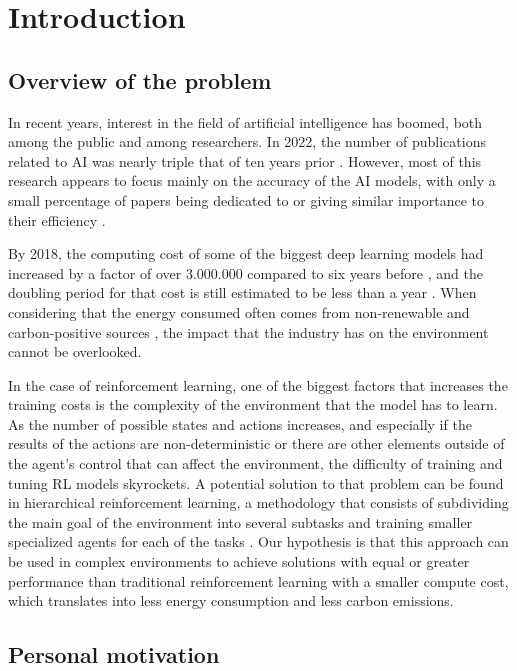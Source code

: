 \chapter{Introduction}
\label{chapter:introduction}

\section{Overview of the problem}

In recent years, interest in the field of artificial intelligence has boomed, both among the public and among researchers. In 2022, the number of publications related to AI was nearly triple that of ten years prior \cite{Nestor:2024}. However, most of this research appears to focus mainly on the accuracy of the AI models, with only a small percentage of papers being dedicated to or giving similar importance to their efficiency \cite{Schwartz:2019}.

By 2018, the computing cost of some of the biggest deep learning models had increased by a factor of over 3.000.000 compared to six years before \cite{Amodei:2018}, and the doubling period for that cost is still estimated to be less than a year \cite{Jaime:2022}. When considering that the energy consumed often comes from non-renewable and carbon-positive sources \cite{Strubell:2019}, the impact that the industry has on the environment cannot be overlooked.

In the case of reinforcement learning, one of the biggest factors that increases the training costs is the complexity of the environment that the model has to learn. As the number of possible states and actions increases, and especially if the results of the actions are non-deterministic or there are other elements outside of the agent's control that can affect the environment, the difficulty of training and tuning RL models skyrockets. A potential solution to that problem can be found in hierarchical reinforcement learning, a methodology that consists of subdividing the main goal of the environment into several subtasks and training smaller specialized agents for each of the tasks \cite{Pateria:2021}. Our hypothesis is that this approach can be used in complex environments to achieve solutions with equal or greater performance than traditional reinforcement learning with a smaller compute cost, which translates into less energy consumption and less carbon emissions.

\section{Personal motivation}

